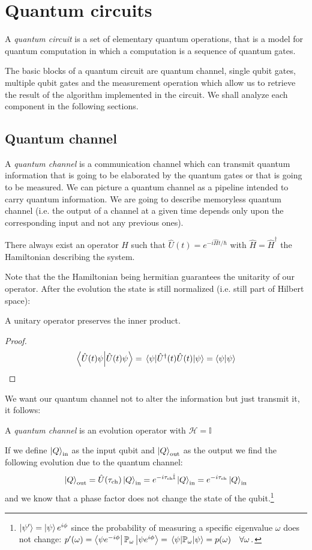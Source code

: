 \section{Quantum circuits}
A \emph{quantum circuit} is a set of elementary quantum operations, that is a model for quantum computation in which a computation is a sequence of quantum gates.

The basic blocks of a quantum circuit are quantum channel, single qubit gates, multiple qubit gates and the measurement operation which allow us to retrieve the result of the algorithm implemented in the circuit. We shall analyze each component in the following sections.
\subsection{Quantum channel}
A \emph{quantum channel} is a communication channel which can transmit quantum information that is going to be elaborated by the quantum gates or that is going to be measured. We can picture a quantum channel as a pipeline intended to carry quantum information. We are going to describe memoryless quantum channel (i.e. the output of a channel at a given time depends only upon the corresponding input and not any previous ones).
\begin{theorem}
There always exist an operator $H$ such that $\hat{U}(t) = e^{-i\hat{H}t/\hbar}$ with $\hat{H} = \hat{H}^\dagger$ the Hamiltonian describing the system. \cite[p.145]{Shankar}
\end{theorem}
Note that the the Hamiltonian being hermitian guarantees the unitarity of our operator. After the evolution the state is still normalized (i.e. still part of Hilbert space):
\begin{theorem}
A unitary operator preserves the inner product.
\end{theorem}
\begin{proof}
\begin{equation*}
    \bra{\hat{U}(t)\psi}\ket{\hat{U}(t)\psi} = \expval{\hat{U}^\dagger(t)\hat{U}(t)}{\psi} = \braket{\psi}
\end{equation*}
\end{proof}
We want our quantum channel not to alter the information but just transmit it, it follows:
\begin{defn}
A \emph{quantum channel} is an evolution operator with $\mathcal{H}=\mathbb{I}$
\end{defn}
If we define $\ket{Q}_\text{in}$ as the input qubit and $\ket{Q}_\text{out}$ as the output we find the following evolution due to the quantum channel:
\begin{equation*}
    \ket{Q}_\text{out} = \hat{U}(\tau_\text{ch}) \ket{Q}_\text{in} = e^{-i\tau_\text{ch}\hat{\mathbb{I}}} \ket{Q}_\text{in} = e^{-i\tau_\text{ch}} \ket{Q}_\text{in}
\end{equation*}
and we know that a phase factor does not change the state of the qubit.\footnote{$\ket{\psi'}= \ket{\psi}e^{i\phi}$ since the probability of measuring a specific eigenvalue $\omega$ does not change: $p'(\omega) = \bra{\psi e^{-i\phi}}\mathbb{P}_\omega\ket{\psi e^{i\phi}} = \expval{\mathbb{P}_\omega}{\psi} = p(\omega) \quad \forall \omega\,.$}
